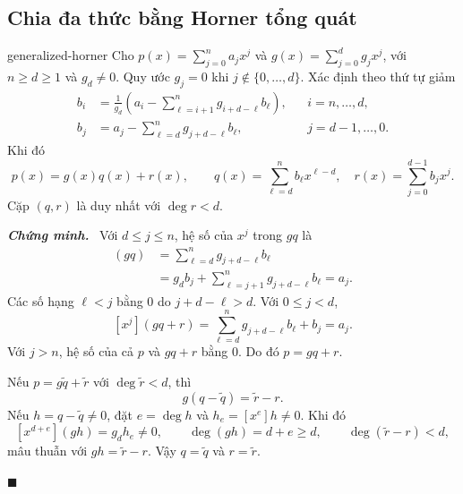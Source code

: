 \documentclass[12pt,a4paper,oneside]{book}
\numberwithin{algorithm}{chapter}
\theoremstyle{definition}
\newenvironment{chungminh}{\par\medskip\noindent\textbf{\textit{\color{mainblue}Chứng minh.}}\ }{\hfill$\blacksquare$\par\medskip}
\begin{document}
\subsection{Chia đa thức bằng Horner tổng quát}
\begin{dinhly}{}{generalized-horner}
Cho $p(x)=\sum_{j=0}^{n}a_jx^j$ và $g(x)=\sum_{j=0}^{d}g_jx^j$, với $n\geq d\geq1$ và $g_d\ne0$. Quy ước $g_j=0$ khi $j\notin\{0,\ldots,d\}$. Xác định theo thứ tự giảm
\begin{equation}\label{eq:generalized-horner}
 \begin{aligned}
 b_i&=\frac{1}{g_d}\left(a_i-
    \sum_{\ell=i+1}^{n}g_{i+d-\ell}b_\ell\right),&&i=n,\ldots,d,\\
 b_j&=a_j-\sum_{\ell=d}^{n}g_{j+d-\ell}b_\ell,&&j=d-1,\ldots,0.
 \end{aligned}
\end{equation}
Khi đó
\begin{equation}\label{eq:generalized-division}
 p(x)=g(x)q(x)+r(x),\qquad
 q(x)=\sum_{\ell=d}^{n}b_\ell x^{\ell-d},\quad
 r(x)=\sum_{j=0}^{d-1}b_jx^j.
\end{equation}
Cặp $(q,r)$ là duy nhất với $\deg r<d$.
\end{dinhly}
\begin{chungminh}
Với $d\leq j\leq n$, hệ số của $x^j$ trong $gq$ là
\begin{align*}
 [x^j](gq)
 &=\sum_{\ell=d}^{n}g_{j+d-\ell}b_\ell\\
 &=g_db_j+\sum_{\ell=j+1}^{n}g_{j+d-\ell}b_\ell=a_j.
\end{align*}
Các số hạng $\ell<j$ bằng $0$ do $j+d-\ell>d$. Với $0\leq j<d$,
\[
 [x^j](gq+r)=\sum_{\ell=d}^{n}g_{j+d-\ell}b_\ell+b_j=a_j.
\]
Với $j>n$, hệ số của cả $p$ và $gq+r$ bằng $0$. Do đó $p=gq+r$.

Nếu $p=g\widetilde q+\widetilde r$ với $\deg\widetilde r<d$, thì
\[
 g(q-\widetilde q)=\widetilde r-r.
\]
Nếu $h=q-\widetilde q\ne0$, đặt $e=\deg h$ và $h_e=[x^e]h\ne0$. Khi đó
\[
 [x^{d+e}](gh)=g_dh_e\ne0,\qquad
 \deg(gh)=d+e\geq d,\qquad\deg(\widetilde r-r)<d,
\]
mâu thuẫn với $gh=\widetilde r-r$. Vậy $q=\widetilde q$ và $r=\widetilde r$.

\end{chungminh}
\end{document}
